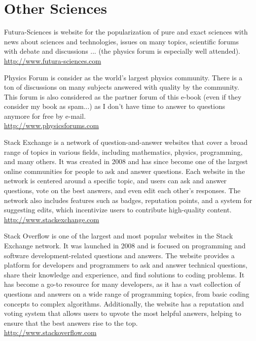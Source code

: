 	\pagebreak
	\section{Other Sciences}
	
	{\Large {}}{\Large {}}{\Large {}}{\Large {}}{\Large {}}\bcdfrance{} Futura-Sciences is website for the popularization of pure and exact sciences with news about sciences and technologies, issues on many topics, scientific forums with debate and discussions ... (the physics forum is especially well attended).\\
	\href{http://www.futura-sciences.com}{\color{blue}http://www.futura-sciences.com}
	
	{\Large {}}{\Large {}}{\Large {}}{\Large {}}{\Large {}} Physics Forum is consider as the world's largest physics community. There is a ton of discussions on many subjects answered with quality by the community. This forum is also considered as the partner forum of this e-book (even if they consider my book as spam...) as I don't have time to answer to questions anymore for free by e-mail. \\
	\href{http://www.physicsforums.com}{\color{blue}http://www.physicsforums.com}
	
	{\Large {}}{\Large {}}{\Large {}}{\Large {}}{\Large {}} Stack Exchange is a network of question-and-answer websites that cover a broad range of topics in various fields, including mathematics, physics, programming, and many others. It was created in 2008 and has since become one of the largest online communities for people to ask and answer questions. Each website in the network is centered around a specific topic, and users can ask and answer questions, vote on the best answers, and even edit each other's responses. The network also includes features such as badges, reputation points, and a system for suggesting edits, which incentivize users to contribute high-quality content.\\
	\href{http://www.stackexchange.com}{\color{blue}http://www.stackexchange.com}
	
	{\Large {}}{\Large {}}{\Large {}}{\Large {}}{\Large {}} Stack Overflow is one of the largest and most popular websites in the Stack Exchange network. It was launched in 2008 and is focused on programming and software development-related questions and answers. The website provides a platform for developers and programmers to ask and answer technical questions, share their knowledge and experience, and find solutions to coding problems. It has become a go-to resource for many developers, as it has a vast collection of questions and answers on a wide range of programming topics, from basic coding concepts to complex algorithms. Additionally, the website has a reputation and voting system that allows users to upvote the most helpful answers, helping to ensure that the best answers rise to the top.\\
	\href{http://www.stackoverflow.com}{\color{blue}http://www.stackoverflow.com}
	
